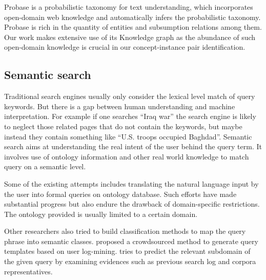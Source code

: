 Probase \cite{wu2012probase} is a probabilistic taxonomy for text understanding, which incorporates open-domain web knowledge and automatically
infers the probabilistic taxonomy.  Probase is rich in the quantity of entities and subsumption relations among them. Our work makes extensive
use of its Knowledge graph as the abundance of such open-domain knowledge is crucial in our concept-instance pair identification.

\subsection{Semantic search}
Traditional search engines usually only consider the lexical level match of query keywords. But there is a gap between human understanding and
machine interpretation. For example if one searches ``Iraq war'' the search engine is likely to neglect those related pages that do not
contain the keywords, but maybe instead they contain something like ``U.S. troops occupied Baghdad''. Semantic search aims at understanding
the real intent of the user behind the query term.\cite{john2012semantic}
It involves use of ontology information and other real world knowledge to match query on a semantic level.

Some of the existing attempts includes translating the natural language input by the user into formal queries on ontology database.\cite{bonino2004ontology}
Such efforts have made substantial progress but also endure the drawback of domain-specific restrictions. The ontology provided is usually
limited to a certain domain.

Other researchers also tried to build classification methods to map the query phrase into semantic classes.
 \cite{demartini2013crowdq} proposed a crowdsourced method to generate query templates based on user log-mining.
 \cite{arguello2009sources} tries to predict the relevant subdomain of the given query by examining evidences such as
previous search log and corpora representatives.
